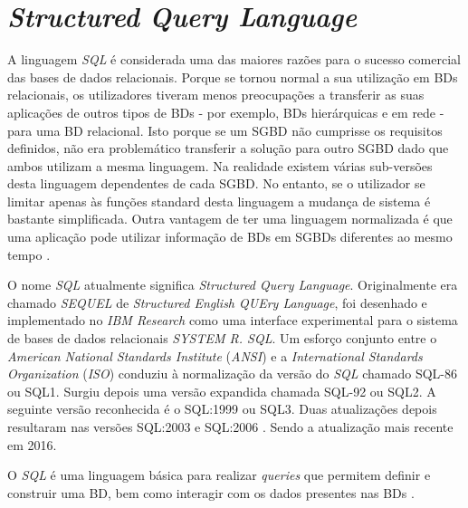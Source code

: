 \documentclass[11pt,twoside,a4paper]{report}
\begin{document}
\section{\textit{Structured Query Language}}
\label{subchap:sql}
A linguagem \textit{SQL} é considerada uma das maiores razões para o sucesso comercial das bases de dados relacionais. Porque se tornou normal a sua utilização em BDs relacionais, os utilizadores tiveram menos preocupações a transferir as suas aplicações de outros tipos de BDs - por exemplo, BDs hierárquicas e em rede - para uma BD relacional. Isto porque se um SGBD não cumprisse os requisitos definidos, não era problemático transferir a solução para outro SGBD dado que ambos utilizam a mesma linguagem. Na realidade existem várias sub-versões desta linguagem dependentes de cada SGBD. No entanto, se o utilizador se limitar apenas às funções standard desta linguagem a mudança de sistema é bastante simplificada. Outra vantagem de ter uma linguagem normalizada é que uma aplicação pode utilizar informação de BDs em SGBDs diferentes ao mesmo tempo \cite{Elmasri:2010:FDS:1855347}.\par 
O nome \textit{SQL} atualmente significa \textit{Structured Query Language}. Originalmente era chamado \textit{SEQUEL} de \textit{Structured English QUEry Language}, foi desenhado e implementado no \textit{IBM Research} como uma interface experimental para o sistema de bases de dados relacionais \textit{SYSTEM R. SQL}. Um esforço conjunto entre o \textit{American National Standards Institute} (\textit{ANSI}) e a \textit{International Standards Organization} (\textit{ISO}) conduziu à normalização da versão do \textit{SQL} chamado SQL-86 ou SQL1. Surgiu depois uma versão expandida chamada SQL-92 ou SQL2. A seguinte versão reconhecida é o SQL:1999 ou SQL3. Duas atualizações depois resultaram nas versões SQL:2003 e SQL:2006  \cite{Elmasri:2010:FDS:1855347}. Sendo a atualização mais recente em 2016.\par 
O \textit{SQL} é uma linguagem básica para realizar \textit{queries} que permitem definir e construir uma BD, bem como interagir com os dados presentes nas BDs \cite{Elmasri:2010:FDS:1855347}.
\end{document}
